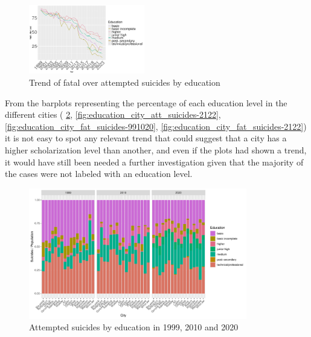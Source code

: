 \documentclass{article}
\begin{document}
\begin{figure}[H]
    \centering
    \includegraphics[width=0.45\textwidth]{imgs/education_foa.pdf}
    \caption{Trend of fatal over attempted suicides by education }
    \label{fig:education_foa}
\end{figure}


From the barplots representing the percentage of each education level
in the different cities (
\ref {fig:education_city_att_suicides-991020},
\ref {fig:education_city_att_suicides-2122},
\ref {fig:education_city_fat_suicides-991020},
\ref {fig:education_city_fat_suicides-2122})
it is not easy to spot any relevant trend that could suggest that a city
has a higher scholarization level than another, and even if the plots
had shown a trend, it would have still been needed a further investigation
given that the majority of the cases were not labeled with an education level.
\begin{figure}[H]
    \centering
    \includegraphics[width=0.85\textwidth]{imgs/education_city_att_suicides-991020.pdf}
    \caption{Attempted suicides by education  in 1999, 2010 and 2020}
    \label{fig:education_city_att_suicides-991020}
\end{figure}
\end{document}
